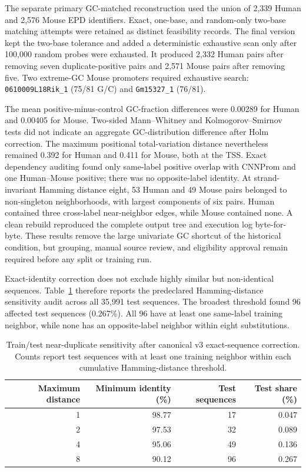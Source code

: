 The separate primary GC-matched reconstruction used the union of 2,339 Human
and 2,576 Mouse EPD identifiers. Exact, one-base, and random-only two-base
matching attempts were retained as distinct feasibility records. The final
version kept the two-base tolerance and added a deterministic exhaustive scan
only after 100,000 random probes were exhausted. It produced 2,332 Human pairs
after removing seven duplicate-positive pairs and 2,571 Mouse pairs after
removing five. Two extreme-GC Mouse promoters required exhaustive search:
\texttt{0610009L18Rik\_1} (75/81 G/C) and \texttt{Gm15327\_1} (76/81).

The mean positive-minus-control GC-fraction differences were 0.00289 for Human
and 0.00405 for Mouse. Two-sided Mann--Whitney and Kolmogorov--Smirnov tests did
not indicate an aggregate GC-distribution difference after Holm correction.
The maximum positional total-variation distance nevertheless remained 0.392
for Human and 0.411 for Mouse, both at the TSS. Exact dependency auditing found
only same-label positive overlap with CNNProm and one Human--Mouse positive;
there was no opposite-label identity. At strand-invariant Hamming distance
eight, 53 Human and 49 Mouse pairs belonged to non-singleton neighborhoods,
with largest components of six pairs. Human contained three cross-label
near-neighbor edges, while Mouse contained none. A clean rebuild reproduced the
complete output tree and execution log byte-for-byte. These results remove the
large univariate GC shortcut of the historical condition, but grouping, manual
source review, and eligibility approval remain required before any split or
training run.

Exact-identity correction does not exclude highly similar but non-identical
sequences. Table~\ref{tab:results-near-duplicate-sensitivity} therefore reports
the predeclared Hamming-distance sensitivity audit across all 35,991 test
sequences. The broadest threshold found 96 affected test sequences (0.267\%).
All 96 have at least one same-label training neighbor, while none has an
opposite-label neighbor within eight substitutions.

\begin{table}[htbp]
  \centering
  \caption{Train/test near-duplicate sensitivity after canonical v3 exact-sequence correction. Counts report test sequences with at least one training neighbor within each cumulative Hamming-distance threshold.}
  \label{tab:results-near-duplicate-sensitivity}
  \begin{tabular}{rrrr}
    \toprule
    Maximum distance & Minimum identity (\%) & Test sequences & Test share (\%) \\
    \midrule
    1 & 98.77 & 17 & 0.047 \\
    2 & 97.53 & 32 & 0.089 \\
    4 & 95.06 & 49 & 0.136 \\
    8 & 90.12 & 96 & 0.267 \\
    \bottomrule
  \end{tabular}
\end{table}

